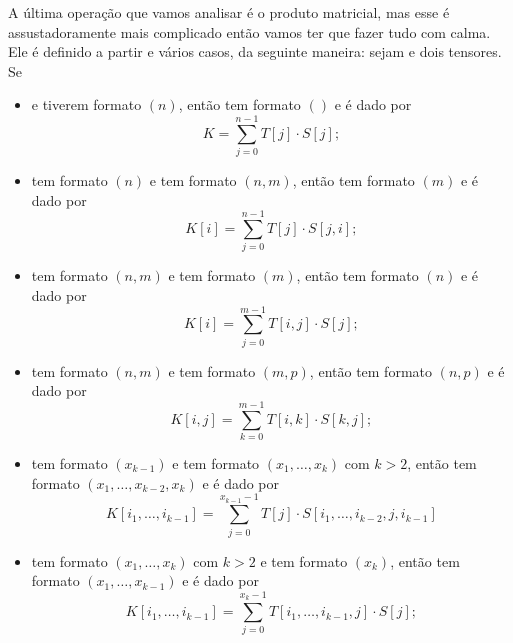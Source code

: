 \documentclass{article}
\begin{document}
A última operação que vamos analisar é o produto matricial, mas esse é assustadoramente mais complicado então vamos ter que fazer tudo com calma. Ele é definido a partir e vários casos, da seguinte maneira: sejam  e  dois tensores. Se \begin{itemize}
    \item {} e  tiverem formato $(n)$, então  tem formato $()$ e é dado por \begin{equation}
        K = \sum_{j = 0}^{n - 1} T[j] \cdot S[j];
    \end{equation}

    \item {} tem formato $(n)$ e  tem formato $(n, m)$, então  tem formato $(m)$ e é dado por \begin{equation}
        K[i] = \sum_{j = 0}^{n-1} T[j] \cdot S[j, i];
    \end{equation}

    \item {} tem formato $(n, m)$ e  tem formato $(m)$, então  tem formato $(n)$ e é dado por \begin{equation}
        K[i] = \sum_{j = 0}^{m-1} T[i,j] \cdot S[j];
    \end{equation}

    \item {} tem formato $(n,m)$ e  tem formato $(m,p)$, então  tem formato $(n,p)$ e é dado por \begin{equation}
        K[i,j] = \sum_{k = 0}^{m-1} T[i, k] \cdot S[k, j];
    \end{equation}

    \item {} tem formato $(x_{k-1})$ e  tem formato $(x_1, \dots, x_k)$ com $k > 2$, então  tem formato $(x_1, \dots, x_{k-2}, x_k)$ e é dado por \begin{equation}
        K[i_1, \dots, i_{k-1}] = \sum_{j = 0}^{x_{k-1} - 1} T[j] \cdot S[i_1, \dots, i_{k-2}, j, i_{k-1}]
    \end{equation}

    \item {} tem formato $(x_1, \dots, x_k)$ com $k > 2$ e  tem formato $(x_{k})$, então  tem formato $(x_1, \dots, x_{k-1})$ e é dado por \begin{equation}
        K[i_1, \dots, i_{k-1}] = \sum_{j = 0}^{x_k - 1} T[i_1, \dots, i_{k-1}, j] \cdot S[j];
    \end{equation}


\end{itemize}
\end{document}
